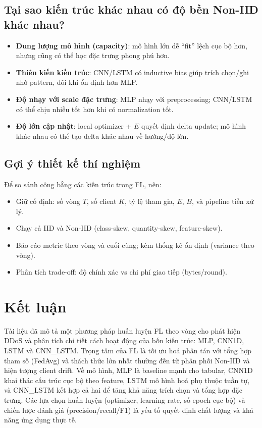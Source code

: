 \documentclass[12pt,a4paper]{article}
\begin{document}
\subsection{Tại sao kiến trúc khác nhau có độ bền Non-IID khác nhau?}
\begin{itemize}
    \item \textbf{Dung lượng mô hình (capacity)}: mô hình lớn dễ ``fit'' lệch cục bộ hơn, nhưng cũng có thể học đặc trưng phong phú hơn.
    \item \textbf{Thiên kiến kiến trúc}: CNN/LSTM có inductive bias giúp trích chọn/ghi nhớ pattern, đôi khi ổn định hơn MLP.
    \item \textbf{Độ nhạy với scale đặc trưng}: MLP nhạy với preprocessing; CNN/LSTM có thể chịu nhiễu tốt hơn khi có normalization tốt.
    \item \textbf{Độ lớn cập nhật}: local optimizer + $E$ quyết định delta update; mô hình khác nhau có thể tạo delta khác nhau về hướng/độ lớn.
\end{itemize}

\subsection{Gợi ý thiết kế thí nghiệm}
Để so sánh công bằng các kiến trúc trong FL, nên:
\begin{itemize}
    \item Giữ cố định: số vòng $T$, số client $K$, tỷ lệ tham gia, $E$, $B$, và pipeline tiền xử lý.
    \item Chạy cả IID và Non-IID (class-skew, quantity-skew, feature-skew).
    \item Báo cáo metric theo vòng và cuối cùng; kèm thống kê ổn định (variance theo vòng).
    \item Phân tích trade-off: độ chính xác vs chi phí giao tiếp (bytes/round).
\end{itemize}

\section{Kết luận}

Tài liệu đã mô tả một phương pháp huấn luyện FL theo vòng cho phát hiện DDoS và phân tích chi tiết cách hoạt động của bốn kiến trúc: MLP, CNN1D, LSTM và CNN\_LSTM. Trọng tâm của FL là tối ưu hoá phân tán với tổng hợp tham số (FedAvg) và thách thức lớn nhất thường đến từ phân phối Non-IID và hiện tượng client drift. Về mô hình, MLP là baseline mạnh cho tabular, CNN1D khai thác cấu trúc cục bộ theo feature, LSTM mô hình hoá phụ thuộc tuần tự, và CNN\_LSTM kết hợp cả hai để tăng khả năng trích chọn và tổng hợp đặc trưng. Các lựa chọn huấn luyện (optimizer, learning rate, số epoch cục bộ) và chiến lược đánh giá (precision/recall/F1) là yếu tố quyết định chất lượng và khả năng ứng dụng thực tế.
\end{document}
